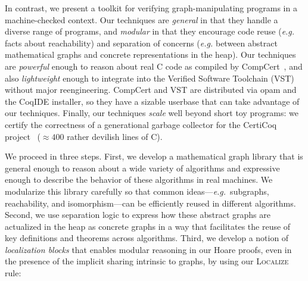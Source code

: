 \documentclass[acmsmall,screen]{acmart}
\begin{document}
In contrast, we present a toolkit for verifying graph-manipulating programs in a
machine-checked context. Our techniques are \emph{general} in that they handle a diverse
range of programs, and \emph{modular} in that they encourage code
reuse (\emph{e.g.} facts about reachability) and separation of concerns
(\emph{e.g.} between abstract mathematical graphs and concrete representations
in the heap).
Our techniques are \emph{powerful} enough to reason about real C code as compiled by
CompCert~\cite{leroy:compcert}, and also
\emph{lightweight} enough to integrate into the Verified
Software Toolchain (VST)~\cite{appel:programlogics} without major reengineering.
CompCert and VST are distributed via opam and the CoqIDE installer, so they have a sizable userbase that can take advantage of our techniques. Finally, our techniques \emph{scale} well beyond short toy programs: we certify the
correctness of a generational garbage collector for the CertiCoq
project~\cite{certicoqpaper} ($\approx400$ rather devilish lines of C).

We proceed in three steps. First, we develop a mathematical graph library that is general enough to reason about a wide variety of algorithms and expressive enough to describe the behavior of these algorithms in real machines.  We modularize this library carefully so that common ideas---\emph{e.g.}~subgraphs, reachability, and isomorphism---can be efficiently reused
in different algorithms.  Second, we use separation logic to express how these abstract graphs
are actualized in the heap as concrete graphs in a way that facilitates the reuse of key definitions and theorems across algorithms.  Third, we develop a notion of \emph{localization blocks} that
enables modular reasoning in our Hoare proofs, even in the presence of the
implicit sharing intrinsic to graphs, by using our \textsc{Localize} rule:
\end{document}
